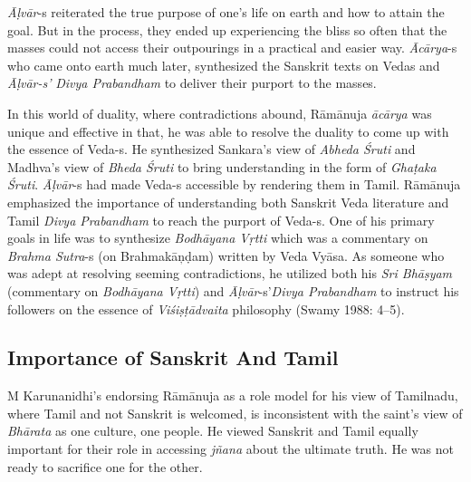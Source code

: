 \textit{Āḷvār}-s reiterated the true purpose of one’s life on earth and how to attain the goal. But in the process, they ended up experiencing the bliss so often that the masses could not access their outpourings in a practical and easier way. \textit{Ācārya}-s who came onto earth much later, synthesized the Sanskrit texts on Vedas and \textit{Āḷvār-s’ }\textit{Divya Prabandham} to deliver their purport to the masses.

In this world of duality, where contradictions abound, Rāmānuja \textit{ācārya} was unique and effective in that, he was able to resolve the duality to come up with the essence of Veda-s. He synthesized Sankara’s view of \textit{Abheda Śruti} and Madhva’s view of \textit{Bheda Śruti} to bring understanding in the form of \textit{Ghaṭaka Śruti}. \textit{Āḷvār}-s had made Veda-s accessible by rendering them in Tamil. Rāmānuja emphasized the importance of understanding both Sanskrit Veda literature and Tamil \textit{Divya Prabandham} to reach the purport of Veda-s. One of his primary goals in life was to synthesize \textit{Bodhāyana Vṛtti} which was a commentary on \textit{Brahma Sutra}-s (on Brahmakāņḍam) written by Veda Vyāsa. As someone who was adept at resolving seeming contradictions, he utilized both his \textit{Sri Bhāṣyam} (commentary on \textit{Bodhāyana Vṛtti}) and \textit{Āḷvār}-s’\textit{Divya Prabandham} to instruct his followers on the essence of \textit{Viśiṣṭādvaita} philosophy (Swamy 1988: 4–5).

\vskip -20pt


\subsection*{Importance of Sanskrit And Tamil}

\vskip -6pt

M Karunanidhi’s endorsing Rāmānuja as a role model for his view of Tamilnadu, where Tamil and not Sanskrit is welcomed, is inconsistent with the saint’s view of \textit{Bhārata} as one culture, one people. He viewed Sanskrit and Tamil equally important for their role in accessing \textit{jñana} about the ultimate truth. He was not ready to sacrifice one for the other.

